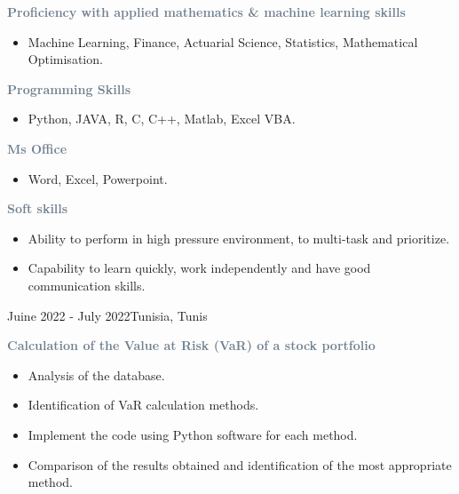  

\textcolor{SlateGrey}{\textbf{Proficiency with applied mathematics \& machine learning skills}}
\newline

\begin{itemize}
    \item Machine Learning, Finance, Actuarial Science, Statistics, Mathematical Optimisation.
   
\end{itemize}

\textcolor{SlateGrey}{\textbf{Programming Skills}}
\newline

\begin{itemize}
    \item Python, JAVA, R, C, C++, Matlab, Excel VBA.
\end{itemize}


\textcolor{SlateGrey}{\textbf{Ms Office }}
\newline

\begin{itemize}
    \item Word, Excel, Powerpoint.
\end{itemize}

\textcolor{SlateGrey}{\textbf{Soft skills}}
\newline

\begin{itemize}
    \item Ability to perform in high pressure environment, to multi-task and prioritize.

    \item Capability to learn quickly, work independently and have good communication skills.
\end{itemize}
{Juine 2022 - July 2022}{Tunisia, Tunis}

\textcolor{SlateGrey}{\textbf{Calculation of the Value at Risk (VaR) of a stock portfolio}}
\newline

\begin{itemize}
    \item Analysis of the database.
    \item Identification of VaR calculation methods.
    \item Implement the code using Python software for each method.
    \item Comparison of the results obtained and identification of the most appropriate method.

\end{itemize}


